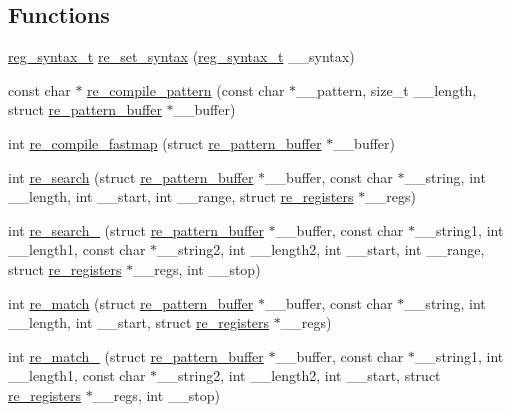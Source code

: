 \subsection*{Functions}
\begin{DoxyCompactItemize}
\item 
\hyperlink{a00092_a7e0565199a2fabaca3d67a5a44fc4229}{reg\+\_\+syntax\+\_\+t} \hyperlink{a00092_ad71c2bb1368325a350179abb1b0e6210}{re\+\_\+set\+\_\+syntax} (\hyperlink{a00092_a7e0565199a2fabaca3d67a5a44fc4229}{reg\+\_\+syntax\+\_\+t} \+\_\+\+\_\+syntax)
\item 
const char $\ast$ \hyperlink{a00092_a25ae17445ee4ec90179552c9ed46752c}{re\+\_\+compile\+\_\+pattern} (const char $\ast$\+\_\+\+\_\+pattern, size\+\_\+t \+\_\+\+\_\+length, struct \hyperlink{a00686}{re\+\_\+pattern\+\_\+buffer} $\ast$\+\_\+\+\_\+buffer)
\item 
int \hyperlink{a00092_a2a196ea5b5ae089a4b5edfb91857fa8f}{re\+\_\+compile\+\_\+fastmap} (struct \hyperlink{a00686}{re\+\_\+pattern\+\_\+buffer} $\ast$\+\_\+\+\_\+buffer)
\item 
int \hyperlink{a00092_a25ace2eeda73683578852e4fb076ffd3}{re\+\_\+search} (struct \hyperlink{a00686}{re\+\_\+pattern\+\_\+buffer} $\ast$\+\_\+\+\_\+buffer, const char $\ast$\+\_\+\+\_\+string, int \+\_\+\+\_\+length, int \+\_\+\+\_\+start, int \+\_\+\+\_\+range, struct \hyperlink{a00690}{re\+\_\+registers} $\ast$\+\_\+\+\_\+regs)
\item 
int \hyperlink{a00092_a800bad488847a47475a7338a62c02ab7}{re\+\_\+search\+\_} (struct \hyperlink{a00686}{re\+\_\+pattern\+\_\+buffer} $\ast$\+\_\+\+\_\+buffer, const char $\ast$\+\_\+\+\_\+string1, int \+\_\+\+\_\+length1, const char $\ast$\+\_\+\+\_\+string2, int \+\_\+\+\_\+length2, int \+\_\+\+\_\+start, int \+\_\+\+\_\+range, struct \hyperlink{a00690}{re\+\_\+registers} $\ast$\+\_\+\+\_\+regs, int \+\_\+\+\_\+stop)
\item 
int \hyperlink{a00092_af46593d8e7b4996e5c2f2677d6c2c7a9}{re\+\_\+match} (struct \hyperlink{a00686}{re\+\_\+pattern\+\_\+buffer} $\ast$\+\_\+\+\_\+buffer, const char $\ast$\+\_\+\+\_\+string, int \+\_\+\+\_\+length, int \+\_\+\+\_\+start, struct \hyperlink{a00690}{re\+\_\+registers} $\ast$\+\_\+\+\_\+regs)
\item 
int \hyperlink{a00092_af3f6a2d60696d6ae560e91c70edc8b74}{re\+\_\+match\+\_} (struct \hyperlink{a00686}{re\+\_\+pattern\+\_\+buffer} $\ast$\+\_\+\+\_\+buffer, const char $\ast$\+\_\+\+\_\+string1, int \+\_\+\+\_\+length1, const char $\ast$\+\_\+\+\_\+string2, int \+\_\+\+\_\+length2, int \+\_\+\+\_\+start, struct \hyperlink{a00690}{re\+\_\+registers} $\ast$\+\_\+\+\_\+regs, int \+\_\+\+\_\+stop)

\end{DoxyCompactItemize}
